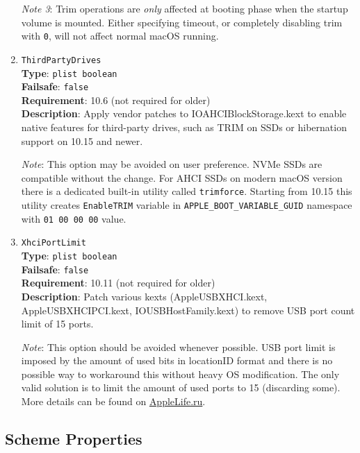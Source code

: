 \documentclass[]{article}
\makeatletter
\renewcommand{\label}[1]{%
\zref@wrapper@immediate{\oldlabel{#1}}}  %
\makeatother
\begin{document}
\begin{enumerate}
  \emph{Note 3}: Trim operations are \emph{only} affected at booting phase when the startup volume is mounted.
  Either specifying timeout, or completely disabling trim with \texttt{0}, will not affect normal macOS running.

\item
  \texttt{ThirdPartyDrives}\\
  \textbf{Type}: \texttt{plist\ boolean}\\
  \textbf{Failsafe}: \texttt{false}\\
  \textbf{Requirement}: 10.6 (not required for older)\\
  \textbf{Description}: Apply vendor patches to IOAHCIBlockStorage.kext to enable
  native features for third-party drives, such as TRIM on SSDs or hibernation
  support on 10.15 and newer.

  \emph{Note}: This option may be avoided on user preference. NVMe SSDs are
  compatible without the change. For AHCI SSDs on modern macOS version there
  is a dedicated built-in utility called \texttt{trimforce}. Starting from 10.15
  this utility creates \texttt{EnableTRIM} variable in \texttt{APPLE\_BOOT\_VARIABLE\_GUID}
  namespace with \texttt{01 00 00 00} value.

\item
  \texttt{XhciPortLimit}\\
  \textbf{Type}: \texttt{plist\ boolean}\\
  \textbf{Failsafe}: \texttt{false}\\
  \textbf{Requirement}: 10.11 (not required for older)\\
  \textbf{Description}: Patch various kexts (AppleUSBXHCI.kext, AppleUSBXHCIPCI.kext,
  IOUSBHostFamily.kext) to remove USB port count limit of 15 ports.

  \emph{Note}: This option should be avoided whenever possible. USB port limit
  is imposed by the amount of used bits in locationID format and there is no
  possible way to workaround this without heavy OS modification. The only
  valid solution is to limit the amount of used ports to 15 (discarding some).
  More details can be found on \href{https://applelife.ru/posts/550233}{AppleLife.ru}.

\end{enumerate}

\subsection{Scheme Properties}\label{kernelpropsscheme}
\end{document}
